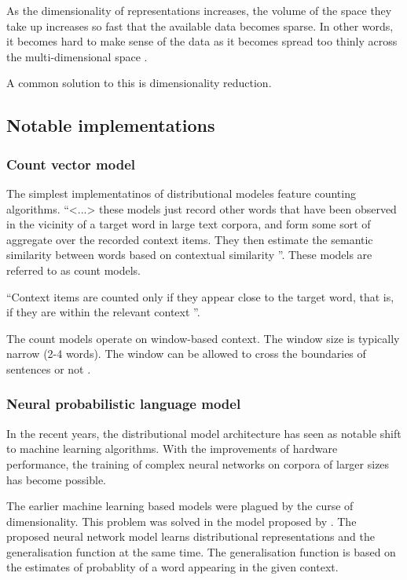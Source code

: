 \documentclass[14pt, a4paper]{extreport}
\begin{document}
As the dimensionality of representations increases, the volume of the space they take up increases so fast that the available data becomes sparse. In other words, it becomes hard to make sense of the data as it becomes spread too thinly across the multi-dimensional space \parencite{venkat}.

A common solution to this is dimensionality reduction.

    \subsection{Notable implementations}
      \subsubsection{Count vector model}
The simplest implementatinos of distributional modeles feature counting algorithms. ``<...> these models just record other words that have been observed in the vicinity of a target word in large text corpora, and form some sort of aggregate over the recorded context items. They then estimate the semantic similarity between words based on contextual similarity \parencite{erkkatrin2}''. These models are referred to as count models.

``Context items are counted only if they appear close to the target word, that is, if they are within the relevant context \parencite{erkkatrin2}''.

The count models operate on window-based context. The window size is typically narrow (2-4 words). The window can be allowed to cross the boundaries of sentences or not \parencite{baroni}.
      \subsubsection{Neural probabilistic language model}
In the recent years, the distributional model architecture has seen as notable shift to machine learning algorithms. With the improvements of hardware performance, the training of complex neural networks on corpora of larger sizes has become possible. 

The earlier machine learning based models were plagued by the curse of dimensionality. This problem was solved in the model proposed by \parencite{bengio}. The proposed neural network model learns distributional representations and the generalisation function at the same time. The generalisation function is based on the estimates of probablity of a word appearing in the given context.
\end{document}
